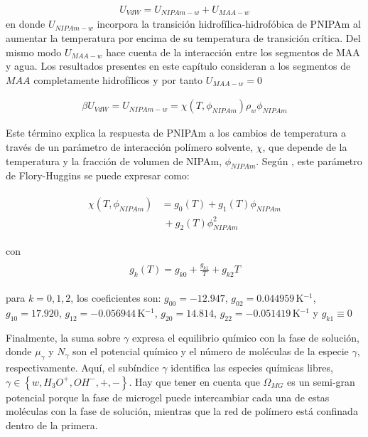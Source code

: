 \begin{align}
	U_{VdW} = U_{NIPAm-w} + U_{MAA-w}
\end{align}
\noindent en donde $U_{NIPAm-w}$ incorpora la transici\'on hidrof\'ilica-hidrof\'obica de PNIPAm al aumentar la temperatura por encima de su temperatura de transici\'on cr\'itica. 
Del mismo modo $U_{MAA-w}$ hace cuenta de la interacci\'on entre los segmentos de MAA y agua.
Los resultados presentes en este cap\'itulo consideran a los segmentos de $MAA$ completamente hidrof\'ilicos y por tanto $U_{MAA-w} = 0$

\begin{align}
	\beta U_{VdW} = U_{NIPAm-w} = \chi (T, \phi_{NIPAm})\rho_w \phi_{NIPAm}
\end{align}


Este  t\'ermino explica la respuesta de PNIPAm a los cambios de temperatura a trav\'es de un par\'ametro de interacci\'on pol\'imero solvente, $\chi$, que depende de la temperatura y la fracci\'on de volumen de NIPAm, $\phi_{NIPAm}$.
Seg\'un  \citet{afroze2000}, este par\'ametro de Flory-Huggins se puede expresar como:
%
%


\begin{align}
	\begin{aligned}
		\chi (T, \phi_{NIPAm}) &=g_0(T) +g_1(T)\phi_{NIPAm} \\
		&~+ g_2(T)\phi_{NIPAm}^2
	\end{aligned}
\end{align}

\noindent con
%
%
\begin{align}
	\begin{aligned} 
		g_k(T)=g_{k0} + \frac{g_{k1}}{T} + g_{k2}T
	\end{aligned}
\end{align}


\noindent para  $k=0,1,2$, los coeficientes son: $g_{00}= -12.947$, $g_{02}=0.044959\,$K$^{-1}$, $g_{10}= 17.920$, $g_{12}= -0.056944$\,K$^{-1}$, $g_{20}= 14.814$, $g_{22}= -0.051419$\,K$^{-1}$  y $g_{k1}\equiv 0$ \cite{afroze2000}




Finalmente, la suma sobre  $\gamma$ expresa el equilibrio qu\'imico con la fase de soluci\'on, donde $\mu_\gamma$ y $N_\gamma$ son el potencial qu\'imico y el n\'umero de mol\'eculas de la especie $\gamma$, respectivamente.
Aqu\'i, el subíndice $\gamma$ identifica  las especies qu\'imicas libres, $\gamma \in \left\{ w, H_3O^+, OH^-, +,- \right\}$.
Hay que tener en cuenta que $\Omega_{MG}$ es un semi-gran potencial porque la fase de microgel puede intercambiar cada una de estas mol\'eculas con la fase de soluci\'on, mientras que la red de pol\'imero est\'a confinada dentro de la primera.


